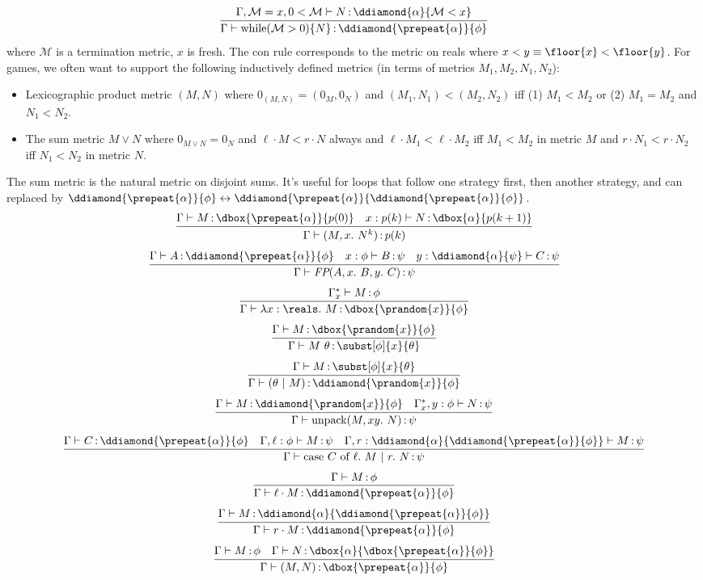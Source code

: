 \documentclass[12pt]{cmuthesis}
\theoremstyle{definition}
\theoremstyle{remark}
\newcommand{\lequiv}{\leftrightarrow}
\begin{document}
\[\infer{\proves{\G}{\ewhile{\mathcal{M}}{N}}{\ddiamond{\prepeat{\alpha}}{\phi}}}
        {\proves{\G,\mathcal{M}=x,0<\mathcal{M}}{N}{\ddiamond{\alpha}{\mathcal{M}<x}}}\]
where $\mathcal{M}$ is a termination metric, $x$ is fresh.
The con rule corresponds to the metric on reals where $x < y \equiv \floor{x} < \floor{y}$.
For games, we often want to support the following inductively defined metrics (in terms of metrics $M_1, M_2, N_1, N_2$):
\begin{itemize}
\item Lexicographic product metric $(M,N)$ where $0_{(M,N)}=(0_M,0_N)$ and $(M_1,N_1) < (M_2,N_2)$ iff (1) $M_1 < M_2$ or (2) $M_1 = M_2$ and $N_1 < N_2$.
\item The sum metric $M \lor N$ where  $0_{M \lor N} = 0_N$ and $\ell\cdot M < r\cdot N$ always and $\ell\cdot M_1 <\ell \cdot M_2$ iff $M_1 < M_2$ in metric $M$ and $r\cdot N_1 < r\cdot N_2$ iff $N_1 < N_2$ in metric $N$.
\end{itemize}
The sum metric is the natural metric on disjoint sums.
It's useful for loops that follow one strategy first, then another strategy, and can replaced by $\ddiamond{\prepeat{\alpha}}{\phi} \lequiv \ddiamond{\prepeat{\alpha}}{\ddiamond{\prepeat{\alpha}}{\phi}}$.
\[\infer{\proves{\G}{\eloopelim{M}{N}{k}}{p(k)}}
        {\proves{\G}{M}{\dbox{\prepeat{\alpha}}{p(0)}}
        &\proves{x:p(k)}{N}{\dbox{\alpha}{p(k+1)}}}\]
\[\infer{\proves{\G}{\efp{A}{B}{C}}{\psi}}
        {\proves{\G}{A}{\ddiamond{\prepeat{\alpha}}{\phi}} 
        &\proves{x:\phi}{B}{\psi} & \proves{y:\ddiamond{\alpha}{\psi}}{C}{\psi}}\]
\[\infer{\proves{\G}{\elam{\reals}{M}}{\dbox{\prandom{x}}{\phi}}}
        {\proves{\G_x^*}{M}{\phi}}\]
\[\infer{\proves{\G}{\eapp{M}{\theta}}{\subst[\phi]{x}{\theta}}}
        {\proves{\G}{M}{\dbox{\prandom{x}}{\phi}}}\]
\[\infer{\proves{\G}{\etcons{\theta}{M}}{\ddiamond{\prandom{x}}{\phi}}}
        {\proves{\G}{M}{\subst[\phi]{x}{\theta}}}\]
\[\infer{\proves{\G}{\eunpack{M}{N}}{\psi}}
        {\proves{\G}{M}{\ddiamond{\prandom{x}}{\phi}} & \proves{\G_x^*,y:\phi}{N}{\psi}}\]
\[\infer{\proves{\G}{\ecase{C}{M}{N}}{\psi}}
        {\proves{\G}{C}{\ddiamond{\prepeat{\alpha}}{\phi}}
        &\proves{\G,\ell:\phi}{M}{\psi}
        &\proves{\G,r:\ddiamond{\alpha}{\ddiamond{\prepeat{\alpha}}{\phi}}}{M}{\psi}}\]
\[\infer{\proves{\G}{\einjL{M}}{\ddiamond{\prepeat{\alpha}}{\phi}}}
        {\proves{\G}{M}{\phi}}\]
\[\infer{\proves{\G}{\einjR{M}}{\ddiamond{\prepeat{\alpha}}{\phi}}}
        {\proves{\G}{M}{\ddiamond{\alpha}{\ddiamond{\prepeat{\alpha}}{\phi}}}}\]
\[\infer{\proves{\G}{\econs{M}{N}}{\dbox{\prepeat{\alpha}}{\phi}}}
        {\proves{\G}{M}{\phi} & \proves{\G}{N}{\dbox{\alpha}{\dbox{\prepeat{\alpha}}{\phi}}}}\]
\end{document}

